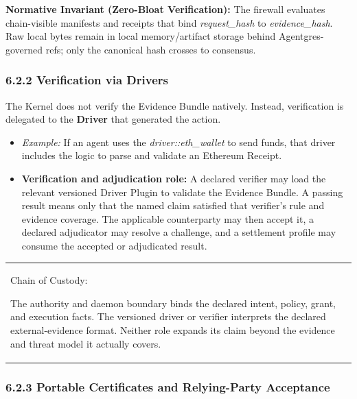 \documentclass[
  11pt,
]{article}
\providecommand{\tightlist}{%
  \setlength{\itemsep}{0pt}\setlength{\parskip}{0pt}}
\begin{document}
\textbf{Normative Invariant (Zero-Bloat Verification):} The firewall
evaluates chain-visible manifests and receipts that bind
\emph{request\_hash} to \emph{evidence\_hash}. Raw local bytes remain in
local memory/artifact storage behind Agentgres-governed refs; only the
canonical hash crosses to consensus.

\hypertarget{verification-via-drivers}{%
\subsubsection{6.2.2 Verification via
Drivers}\label{verification-via-drivers}}

The Kernel does not verify the Evidence Bundle natively. Instead,
verification is delegated to the \textbf{Driver }that generated the
action.

\begin{itemize}
\tightlist
\item
  \emph{Example:} If an agent uses the \emph{driver::eth\_wallet} to
  send funds, that driver includes the logic to parse and validate an
  Ethereum Receipt.
\item
  \textbf{Verification and adjudication role:} A declared verifier may load
  the relevant versioned Driver Plugin to validate the Evidence Bundle. A
  passing result means only that the named claim satisfied that verifier's
  rule and evidence coverage. The applicable counterparty may then accept it,
  a declared adjudicator may resolve a challenge, and a settlement profile may
  consume the accepted or adjudicated result.
\end{itemize}

\begin{longtable}[]{@{}
  >{\raggedright\arraybackslash}p{}@{}}
\toprule\noalign{}
 \\
\midrule\noalign{}
\endhead
\bottomrule\noalign{}
\endlastfoot
Chain of Custody:

The authority and daemon boundary binds the declared intent, policy, grant,
and execution facts. The versioned driver or verifier interprets the declared
external-evidence format. Neither role expands its claim beyond the evidence
and threat model it actually covers. \\
\end{longtable}

\hypertarget{portable-certificates-and-relying-party-acceptance}{%
\subsubsection{6.2.3 Portable Certificates and Relying-Party
Acceptance}\label{portable-certificates-and-relying-party-acceptance}}
\end{document}
